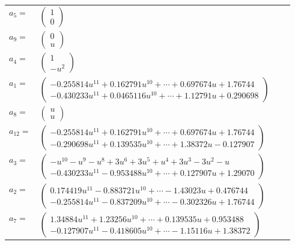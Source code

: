 \documentclass[1p]{elsarticle_modified}
\theoremstyle{definition}
\begin{document}
\begin{tabular}{m{7pt} m{180pt} m{7pt} m{180pt} }
\flushright $a_{5}=$&$\begin{pmatrix}1\\0\end{pmatrix}$ \\
\flushright $a_{9}=$&$\begin{pmatrix}0\\u\end{pmatrix}$ \\
\flushright $a_{4}=$&$\begin{pmatrix}1\\- u^2\end{pmatrix}$ \\
\flushright $a_{1}=$&$\begin{pmatrix}-0.255814 u^{11}+0.162791 u^{10}+\cdots+0.697674 u+1.76744\\-0.430233 u^{11}+0.0465116 u^{10}+\cdots+1.12791 u+0.290698\end{pmatrix}$ \\
\flushright $a_{8}=$&$\begin{pmatrix}u\\u\end{pmatrix}$ \\
\flushright $a_{12}=$&$\begin{pmatrix}-0.255814 u^{11}+0.162791 u^{10}+\cdots+0.697674 u+1.76744\\-0.290698 u^{11}+0.139535 u^{10}+\cdots+1.38372 u-0.127907\end{pmatrix}$ \\
\flushright $a_{3}=$&$\begin{pmatrix}- u^{10}- u^9- u^8+3 u^6+3 u^5+u^4+3 u^3-3 u^2- u\\-0.430233 u^{11}-0.953488 u^{10}+\cdots+0.127907 u+1.29070\end{pmatrix}$ \\
\flushright $a_{2}=$&$\begin{pmatrix}0.174419 u^{11}-0.883721 u^{10}+\cdots-1.43023 u+0.476744\\-0.255814 u^{11}-0.837209 u^{10}+\cdots-0.302326 u+1.76744\end{pmatrix}$ \\
\flushright $a_{7}=$&$\begin{pmatrix}1.34884 u^{11}+1.23256 u^{10}+\cdots+0.139535 u+0.953488\\-0.127907 u^{11}-0.418605 u^{10}+\cdots-1.15116 u+1.38372\end{pmatrix}$ \\

\end{tabular}
\end{document}
